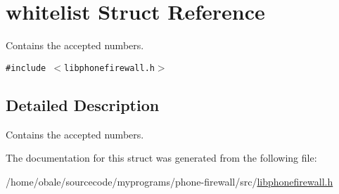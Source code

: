 \hypertarget{structwhitelist}{
\section{whitelist Struct Reference}
\label{structwhitelist}
}
Contains the accepted numbers.  


{\tt \#include $<$libphonefirewall.h$>$}



\subsection{Detailed Description}
Contains the accepted numbers. 

The documentation for this struct was generated from the following file:\begin{CompactItemize}
\item 
/home/obale/sourcecode/myprograms/phone-firewall/src/\hyperlink{libphonefirewall_8h}{libphonefirewall.h}\end{CompactItemize}
